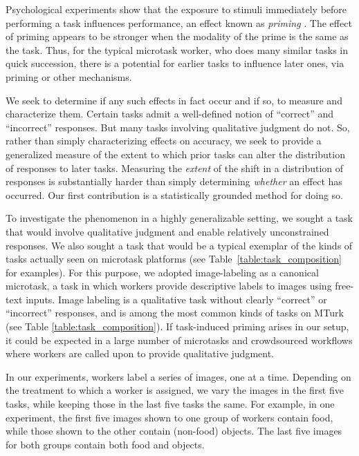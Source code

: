 \documentclass{sigchi}
\begin{document}
Psychological experiments show that the exposure to stimuli immediately 
before performing a task influences performance, an effect known as 
\textit{priming} \cite{BJOP1796}.
The effect of priming appears to be stronger when the modality of the
prime is the same as the task.
Thus, for the typical microtask worker, who does many similar tasks in
quick succession, there is a potential for earlier tasks to influence
later ones, via priming or other mechanisms.

We seek to determine if any such effects in fact occur and if so, 
to measure and characterize them.
Certain tasks admit a well-defined notion of ``correct'' and 
``incorrect'' responses.  But many tasks involving qualitative judgment
do not.  So, rather than simply characterizing effects on accuracy, we seek
to provide a generalized measure of the extent to which prior tasks
can alter the distribution of responses to later tasks.  
Measuring the \textit{extent} of the shift in a distribution of responses 
is substantially harder than simply determining \textit{whether} an effect 
has occurred.  Our first contribution is a statistically grounded method 
for doing so.

To investigate the phenomenon in a
highly generalizable setting, we sought a task that would involve 
qualitative judgment and enable relatively unconstrained responses. 
We also sought a task that would be a typical exemplar of the kinds of
tasks actually seen on microtask platforms (see 
Table~\ref{table:task_composition} for examples).  For this purpose, we 
adopted
image-labeling as a canonical microtask, a task in which workers provide 
descriptive labels to images using free-text inputs.  Image labeling is
a qualitative task without clearly ``correct'' or ``incorrect'' responses,
and is among the most common kinds of tasks on MTurk 
(see Table \ref{table:task_composition}).
If task-induced priming arises in our 
setup, it could be expected in a large number of microtasks and 
crowdsourced workflows where workers are called upon to provide qualitative
judgment.

In our experiments, workers label a series of images, one at a time.
Depending on the treatment to which a worker is assigned, we vary the
images in the first five tasks, while keeping those in the last five tasks 
the same.  For example, in one experiment, the first five images shown to
one group of workers contain food, while those shown to the other 
contain (non-food) objects.  The last five images for both
groups contain both food and objects.
\end{document}

